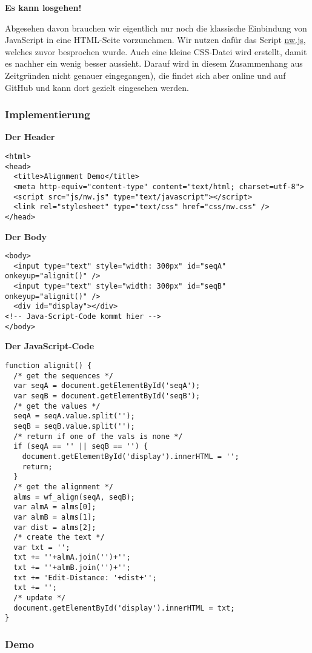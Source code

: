 \par\noindent\textbf{Es kann losgehen!}

Abgesehen davon brauchen wir eigentlich nur noch die klassische
Einbindung von JavaScript in eine HTML-Seite vorzunehmen. Wir nutzen
dafür das Script
\href{https://github.com/LinguList/pyjs-seminar/blob/master/website/code/nw.js}{nw.js},
welches zuvor besprochen wurde. Auch eine kleine CSS-Datei wird
erstellt, damit es nachher ein wenig besser aussieht. Darauf wird in
diesem Zusammenhang aus Zeitgründen nicht genauer eingegangen), die
findet sich aber online und auf GitHub und kann dort gezielt eingesehen
werden.


\subsubsection{\texorpdfstring{{Implementierung}}{Implementierung}}

\par\noindent\textbf{Der Header}

\begin{verbatim}
<html>
<head>
  <title>Alignment Demo</title>
  <meta http-equiv="content-type" content="text/html; charset=utf-8">
  <script src="js/nw.js" type="text/javascript"></script>
  <link rel="stylesheet" type="text/css" href="css/nw.css" />
</head>
\end{verbatim}



\par\noindent\textbf{Der Body}

\begin{verbatim}
<body>
  <input type="text" style="width: 300px" id="seqA" onkeyup="alignit()" />
  <input type="text" style="width: 300px" id="seqB" onkeyup="alignit()" />
  <div id="display"></div>
<!-- Java-Script-Code kommt hier -->
</body>
\end{verbatim}



\par\noindent\textbf{Der JavaScript-Code}

\begin{verbatim}
function alignit() {
  /* get the sequences */
  var seqA = document.getElementById('seqA');
  var seqB = document.getElementById('seqB');
  /* get the values */
  seqA = seqA.value.split('');
  seqB = seqB.value.split('');
  /* return if one of the vals is none */
  if (seqA == '' || seqB == '') {
    document.getElementById('display').innerHTML = '';
    return;
  }
  /* get the alignment */
  alms = wf_align(seqA, seqB);
  var almA = alms[0];
  var almB = alms[1];
  var dist = alms[2];
  /* create the text */
  var txt = '';
  txt += ''+almA.join('')+'';
  txt += ''+almB.join('')+'';
  txt += 'Edit-Distance: '+dist+'';
  txt += '';
  /* update */
  document.getElementById('display').innerHTML = txt;
}
\end{verbatim}


\subsubsection{\texorpdfstring{{Demo}}{Demo}}

